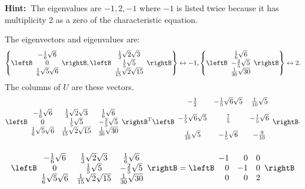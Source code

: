 \begin{enumialphparenastyle}
\begin{ex}
\textbf{Hint:\ }The eigenvalues are $-1,2,-1$ where $-1$ is listed twice
because it has multiplicity 2 as a zero of the characteristic equation.
\begin{sol}
The eigenvectors and eigenvalues are:
\[
\left\{ \leftB
\begin{array}{c}
-\frac{1}{6}\sqrt{6} \\
0 \\
\frac{1}{6}\sqrt{5}\sqrt{6}
\end{array}
\rightB ,\leftB
\begin{array}{c}
\frac{1}{3}\sqrt{2}\sqrt{3} \\
\frac{1}{5}\sqrt{5} \\
\frac{1}{15}\sqrt{2}\sqrt{15}
\end{array}
\rightB \right\} \leftrightarrow -1,\left\{ \leftB
\begin{array}{c}
\frac{1}{6}\sqrt{6} \\
-\frac{2}{5}\sqrt{5} \\
\frac{1}{30}\sqrt{30}
\end{array}
\rightB \right\} \leftrightarrow 2 .
\]
The columns of $U$ are these vectors.
\[
\leftB
\begin{array}{ccc}
-\frac{1}{6}\sqrt{6} & \frac{1}{3}\sqrt{2}\sqrt{3} & \frac{1}{6}\sqrt{6} \\
0 & \frac{1}{5}\sqrt{5} & -\frac{2}{5}\sqrt{5} \\
\frac{1}{6}\sqrt{5}\sqrt{6} & \frac{1}{15}\sqrt{2}\sqrt{15} & \frac{1}{30}
\sqrt{30}
\end{array}
\rightB ^{T}\leftB
\begin{array}{ccc}
-\vspace{0.05in}\frac{1}{2} & -\vspace{0.05in}\frac{1}{5}\sqrt{6}\sqrt{5} &
\vspace{0.05in}\frac{1}{10}\sqrt{5} \\
-\vspace{0.05in}\frac{1}{5}\sqrt{6}\sqrt{5} & \vspace{0.05in}\frac{7}{5} & -
\vspace{0.05in}\frac{1}{5}\sqrt{6} \\
\vspace{0.05in}\frac{1}{10}\sqrt{5} & -\vspace{0.05in}\frac{1}{5}\sqrt{6} & -
\vspace{0.05in}\frac{9}{10}
\end{array}
\rightB \cdot
\]
\[
\leftB
\begin{array}{ccc}
-\frac{1}{6}\sqrt{6} & \frac{1}{3}\sqrt{2}\sqrt{3} & \frac{1}{6}\sqrt{6} \\
0 & \frac{1}{5}\sqrt{5} & -\frac{2}{5}\sqrt{5} \\
\frac{1}{6}\sqrt{5}\sqrt{6} & \frac{1}{15}\sqrt{2}\sqrt{15} & \frac{1}{30}
\sqrt{30}
\end{array}
\rightB =\leftB
\begin{array}{rrr}
-1 & 0 & 0 \\
0 & -1 & 0 \\
0 & 0 & 2
\end{array}
\rightB
\]
\end{sol}
\end{ex}



\end{enumialphparenastyle}
